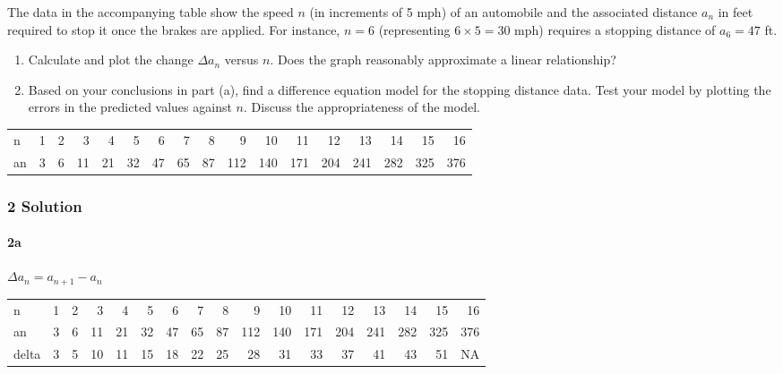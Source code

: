 \documentclass[]{article}
\let\oldparagraph\paragraph
\renewcommand{\paragraph}[1]{\oldparagraph{#1}\mbox{}}
\begin{document}
The data in the accompanying table show the speed \(n\) (in increments
of 5 mph) of an automobile and the associated distance \(a_n\) in feet
required to stop it once the brakes are applied. For instance, \(n = 6\)
(representing \(6 \times 5 = 30\) mph) requires a stopping distance of
\(a_6 = 47\) ft.

\begin{enumerate}
\def\labelenumi{\alph{enumi}.}
\item
  Calculate and plot the change \(\Delta a_n\) versus \(n\). Does the
  graph reasonably approximate a linear relationship?
\item
  Based on your conclusions in part (a), find a difference equation
  model for the stopping distance data. Test your model by plotting the
  errors in the predicted values against \(n\). Discuss the
  appropriateness of the model.
\end{enumerate}

\begin{longtable}[]{@{}lrrrrrrrrrrrrrrrr@{}}
\toprule
\endhead
n & 1 & 2 & 3 & 4 & 5 & 6 & 7 & 8 & 9 & 10 & 11 & 12 & 13 & 14 & 15 &
16\tabularnewline
an & 3 & 6 & 11 & 21 & 32 & 47 & 65 & 87 & 112 & 140 & 171 & 204 & 241 &
282 & 325 & 376\tabularnewline
\bottomrule
\end{longtable}

\hypertarget{solution-1}{%
\subsubsection{2 Solution}\label{solution-1}}

\hypertarget{a}{%
\paragraph{2a}\label{a}}

\(\Delta a_n = a_{n + 1} - a_n\)

\begin{longtable}[]{@{}lrrrrrrrrrrrrrrrr@{}}
\toprule
\endhead
n & 1 & 2 & 3 & 4 & 5 & 6 & 7 & 8 & 9 & 10 & 11 & 12 & 13 & 14 & 15 &
16\tabularnewline
an & 3 & 6 & 11 & 21 & 32 & 47 & 65 & 87 & 112 & 140 & 171 & 204 & 241 &
282 & 325 & 376\tabularnewline
delta & 3 & 5 & 10 & 11 & 15 & 18 & 22 & 25 & 28 & 31 & 33 & 37 & 41 &
43 & 51 & NA\tabularnewline
\bottomrule
\end{longtable}
\end{document}

